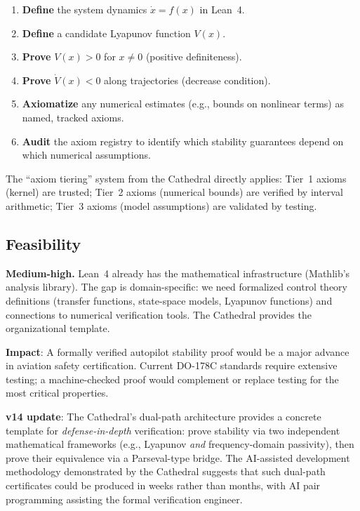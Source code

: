 \documentclass[11pt,a4paper]{article}
\begin{document}
\begin{enumerate}
  \item \textbf{Define} the system dynamics $\dot{x} = f(x)$ in
    Lean~4.
  \item \textbf{Define} a candidate Lyapunov function $V(x)$.
  \item \textbf{Prove} $V(x) > 0$ for $x \neq 0$ (positive
    definiteness).
  \item \textbf{Prove} $\dot{V}(x) < 0$ along trajectories
    (decrease condition).
  \item \textbf{Axiomatize} any numerical estimates (e.g., bounds
    on nonlinear terms) as named, tracked axioms.
  \item \textbf{Audit} the axiom registry to identify which
    stability guarantees depend on which numerical assumptions.
\end{enumerate}

The ``axiom tiering'' system from the Cathedral directly applies:
Tier~1 axioms (kernel) are trusted; Tier~2 axioms (numerical bounds)
are verified by interval arithmetic; Tier~3 axioms (model
assumptions) are validated by testing.

\subsection{Feasibility}

\textbf{Medium-high.} Lean~4 already has the mathematical
infrastructure (Mathlib's analysis library). The gap is
domain-specific: we need formalized control theory definitions
(transfer functions, state-space models, Lyapunov functions) and
connections to numerical verification tools. The Cathedral provides
the organizational template.

\textbf{Impact}: A formally verified autopilot stability proof would
be a major advance in aviation safety certification. Current DO-178C
standards require extensive testing; a machine-checked proof would
complement or replace testing for the most critical properties.

\textbf{v14 update}: The Cathedral's dual-path architecture provides
a concrete template for \emph{defense-in-depth} verification: prove
stability via two independent mathematical frameworks (e.g., Lyapunov
\emph{and} frequency-domain passivity), then prove their equivalence
via a Parseval-type bridge. The AI-assisted development methodology
demonstrated by the Cathedral suggests that such dual-path certificates
could be produced in weeks rather than months, with AI pair programming
assisting the formal verification engineer.
\end{document}
